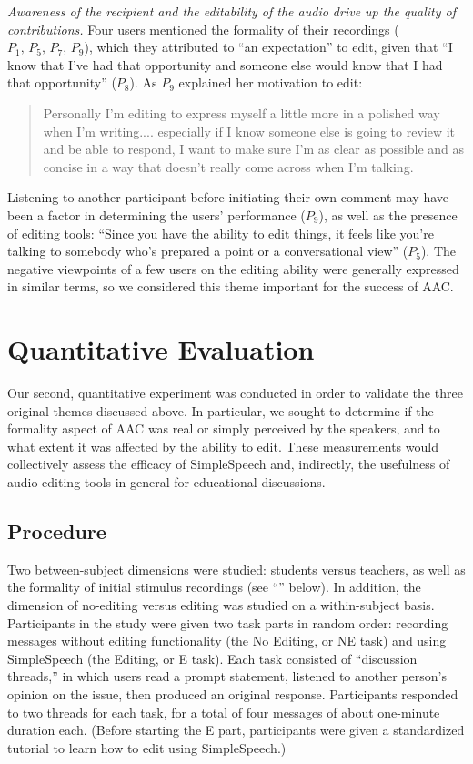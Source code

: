 \emph{Awareness of the recipient and the editability of the audio drive up the quality of contributions.}
Four users mentioned the formality of their recordings ($P_1,\,P_5,\,P_7,\,P_9$), which they attributed to ``an expectation'' to edit, given that ``I know that I've had that opportunity and someone else would know that I had that opportunity'' ($P_8$).
As $P_9$ explained her motivation to edit:
\begin{quote}
	Personally I'm editing to express myself a little more in a polished way when I'm writing.... especially if I know someone else is going to review it and be able to respond, I want to make sure I'm as clear as possible and as concise in a way that doesn't really come across when I'm talking.
\end{quote}
Listening to another participant before initiating their own comment may have been a factor in determining the users' performance ($P_9$), as well as the presence of editing tools: ``Since you have the ability to edit things, it feels like you're talking to somebody who's prepared a point or a conversational view'' ($P_5$). 
The negative viewpoints of a few users on the editing ability were generally expressed in similar terms, so we considered this theme important for the success of AAC.

\section{Quantitative Evaluation}
Our second, quantitative experiment was conducted in order to validate the three original themes discussed above.
In particular, we sought to determine if the formality aspect of AAC was real or simply perceived by the speakers, and to what extent it was affected by the ability to edit.
These measurements would collectively assess the efficacy of SimpleSpeech and, indirectly, the usefulness of audio editing tools in general for educational discussions.

\subsection{Procedure}
Two between-subject dimensions were studied: students versus teachers, as well as the formality of initial stimulus recordings (see ``'' below).
In addition, the dimension of no-editing versus editing was studied on a within-subject basis.
Participants in the study were given two task parts in random order: recording messages without editing functionality (the No Editing, or NE task) and using SimpleSpeech (the Editing, or E task). 
Each task consisted of ``discussion threads,'' in which users read a prompt statement, listened to another person's opinion on the issue, then produced an original response.
Participants responded to two threads for each task, for a total of four messages of about one-minute duration each.
(Before starting the E part, participants were given a standardized tutorial to learn how to edit using SimpleSpeech.)

